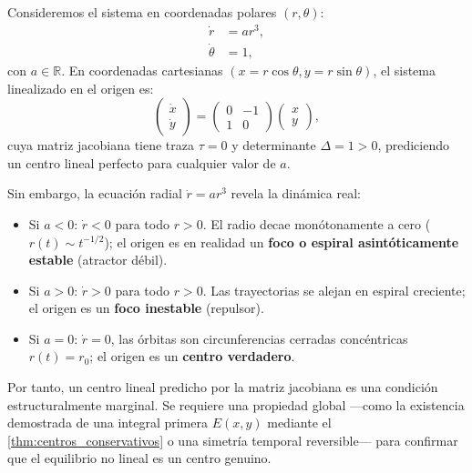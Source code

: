 \begin{example}
Consideremos el sistema en coordenadas polares $(r, \theta)$:
\begin{equation}
\begin{aligned}
    \dot{r} &= a r^3, \\
    \dot{\theta} &= 1,
\end{aligned}
\end{equation}
con $a \in \mathbb{R}$. En coordenadas cartesianas $(x = r\cos\theta, y = r\sin\theta)$, el sistema linealizado en el origen es:
\begin{equation}
    \begin{pmatrix} \dot{x} \\ \dot{y} \end{pmatrix} = \begin{pmatrix} 0 & -1 \\ 1 & 0 \end{pmatrix} \begin{pmatrix} x \\ y \end{pmatrix},
\end{equation}
cuya matriz jacobiana tiene traza $\tau = 0$ y determinante $\Delta = 1 > 0$, prediciendo un centro lineal perfecto para cualquier valor de $a$.

Sin embargo, la ecuación radial $\dot{r} = a r^3$ revela la dinámica real:
\begin{itemize}
    \item Si $a < 0$: $\dot{r} < 0$ para todo $r > 0$. El radio decae monótonamente a cero ($r(t) \sim t^{-1/2}$); el origen es en realidad un \textbf{foco o espiral asintóticamente estable} (atractor débil).
    \item Si $a > 0$: $\dot{r} > 0$ para todo $r > 0$. Las trayectorias se alejan en espiral creciente; el origen es un \textbf{foco inestable} (repulsor).
    \item Si $a = 0$: $\dot{r} = 0$, las órbitas son circunferencias cerradas concéntricas $r(t) = r_0$; el origen es un \textbf{centro verdadero}.
\end{itemize}
\end{example}

Por tanto, un centro lineal predicho por la matriz jacobiana es una condición estructuralmente marginal. Se requiere una propiedad global ---como la existencia demostrada de una integral primera $E(x,y)$ mediante el \cref{thm:centros_conservativos} o una simetría temporal reversible--- para confirmar que el equilibrio no lineal es un centro genuino.


